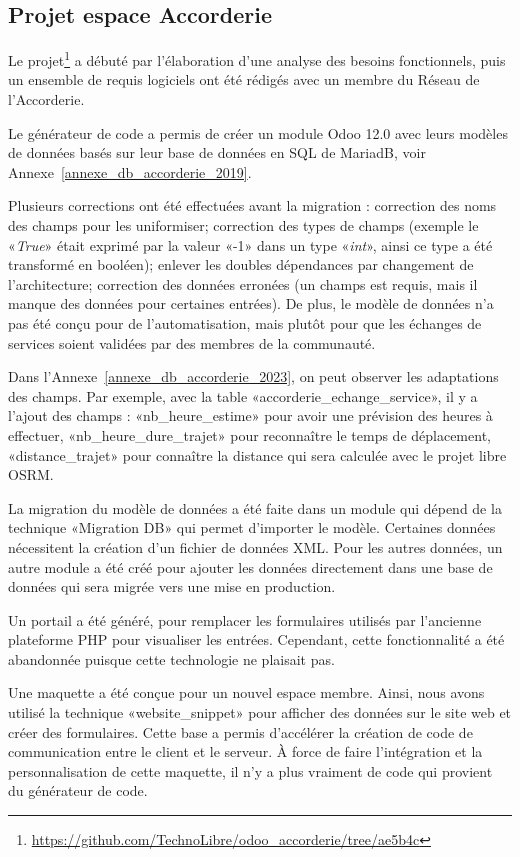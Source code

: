 \subsection{Projet espace Accorderie}

Le projet\footnote{\url{https://github.com/TechnoLibre/odoo_accorderie/tree/ae5b4c}} a débuté par l'élaboration d'une analyse des besoins fonctionnels, puis un ensemble de requis logiciels ont été rédigés avec un membre du Réseau de l'Accorderie. %

Le générateur de code a permis de créer un module Odoo 12.0 avec leurs modèles de données basés sur leur base de données en SQL de MariadB, voir Annexe~\ref{annexe_db_accorderie_2019}.

Plusieurs corrections ont été effectuées avant la migration : correction des noms des champs pour les uniformiser; correction des types de champs (exemple le «\textit{True}» était exprimé par la valeur «-1» dans un type «\textit{int}», ainsi ce type a été transformé en booléen); enlever les doubles dépendances par changement de l’architecture; correction des données erronées (un champs est requis, mais il manque des données pour certaines entrées). De plus, le modèle de données n’a pas été conçu pour de l’automatisation, mais plutôt pour que les échanges de services soient validées par des membres de la communauté.

Dans l'Annexe~\ref{annexe_db_accorderie_2023}, on peut observer les adaptations des champs. Par exemple, avec la table «accorderie\_echange\_service», il y a l'ajout des champs : «nb\_heure\_estime» pour avoir une prévision des heures à effectuer, «nb\_heure\_dure\_trajet» pour reconnaître le temps de déplacement, «distance\_trajet» pour connaître la distance qui sera calculée avec le projet libre OSRM.

La migration du modèle de données a été faite dans un module qui dépend de la technique «Migration DB» qui permet d'importer le modèle. Certaines données nécessitent la création d’un fichier de données XML. Pour les autres données, un autre module a été créé pour ajouter les données directement dans une base de données qui sera migrée vers une mise en production.

Un portail a été généré, pour remplacer les formulaires utilisés par l'ancienne plateforme PHP pour visualiser les entrées. Cependant, cette fonctionnalité a été abandonnée puisque cette technologie ne plaisait pas.

Une maquette a été conçue pour un nouvel espace membre. Ainsi, nous avons utilisé la technique «website\_snippet» pour afficher des données sur le site web et créer des formulaires. Cette base a permis d’accélérer la création de code de communication entre le client et le serveur. À force de faire l’intégration et la personnalisation de cette maquette, il n’y a plus vraiment de code qui provient du générateur de code.

